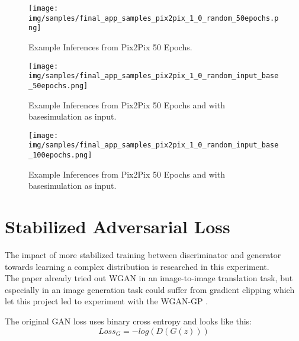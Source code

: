 		\begin{figure}[H]
			\centering
			\texttt{[image: img/samples/final\_app\_samples\_pix2pix\_1\_0\_random\_50epochs.png]}
			\caption[Example Inferences from Pix2Pix 50 Epochs.]{Example Inferences from Pix2Pix 50 Epochs.}
			\label{fig:experiment_input_res_50}
		\end{figure}
		\FloatBarrier
		
		\begin{figure}[H]
			\centering
			\texttt{[image: img/samples/final\_app\_samples\_pix2pix\_1\_0\_random\_input\_base\_50epochs.png]}
			\caption[Example Inferences from Pix2Pix 50 Epochs and with basesimulation as input.]{Example Inferences from Pix2Pix 50 Epochs and with basesimulation as input.}
			\label{fig:experiment_input_res_50_base_input}
		\end{figure}
		\FloatBarrier
		
		\begin{figure}[H]
			\centering
			\texttt{[image: img/samples/final\_app\_samples\_pix2pix\_1\_0\_random\_input\_base\_100epochs.png]}
			\caption[Example Inferences from Pix2Pix 50 Epochs and with basesimulation as input.]{Example Inferences from Pix2Pix 50 Epochs and with basesimulation as input.}
			\label{fig:experiment_input_res_100_base_input}
		\end{figure}
		\FloatBarrier
		
		
	
	\section{Stabilized Adversarial Loss}
	\label{sec:experiments-stabilized_adversarial_loss}
		The impact of more stabilized training between discriminator and generator towards learning a complex distribution is researched in this experiment.\\
		The paper  already tried out WGAN in an image-to-image translation task, but especially in an image generation task could suffer from gradient clipping which let this project led to experiment with the WGAN-GP \cite{gulrajani_improved_2017}.
		
		The original GAN loss uses binary cross entropy and looks like this:
		\begin{equation}
			Loss_G = -log( D( G(z) ) ) 
		\end{equation}
		
